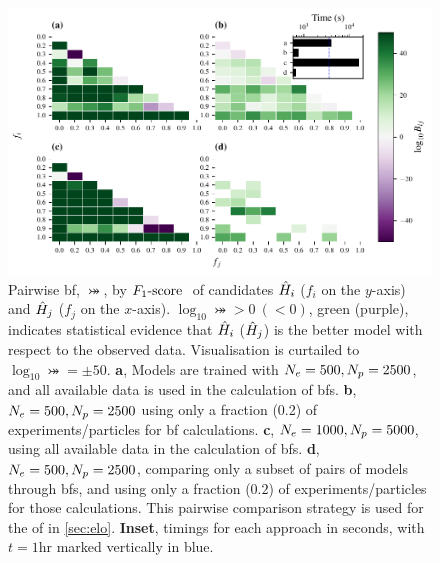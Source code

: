 \begin{figure}
    \includegraphics{theoretical_study/figures/bayes_factors_by_f_scores.pdf}
    \caption[Bayes factors by $\fs$]{
        Pairwise \acrlong{bf}, $\bij$, by $\fs$ of candidates $\hat{H}_i$ ($f_i$ on the $y$-axis) 
        and $\hat{H}_j$ ($f_j$ on the $x$-axis).
        $\log_{10}\bij > 0 \ (<0)$, green (purple), indicates statistical evidence that $\hat{H}_i$ ($\hat{H}_j$) 
        is the better model with respect to the observed data.
        Visualisation is curtailed to $\log_{10} \bij = \pm 50$. 
        \textbf{a}, Models are trained with $N_e=500, N_p=2500$,
            and all available data is used in the calculation of \glspl{bf}. 
        \textbf{b}, $N_e=500, N_p=2500$ using only a fraction (0.2) of \glspl{experiment}/\glspl{particle} for \gls{bf} calculations. 
        \textbf{c}, $N_e=1000, N_p=5000$, using all available data in the calculation of \glspl{bf}. 
        \textbf{d}, $N_e=500, N_p=2500$, comparing only a subset of pairs of models through \glspl{bf}, 
            and using only a fraction ($0.2$) of \glspl{experiment}/\glspl{particle} for those calculations. 
            This pairwise comparison strategy is used for the \gls{of} in \cref{sec:elo}. 
        \textbf{Inset}, timings for each approach in seconds, with $t=1\textrm{hr}$ marked vertically in blue. 
        \figtableref
    }
    \label{fig:bf_by_fscore}
\end{figure}


